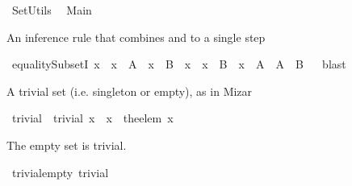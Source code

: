 %
\begin{isabellebody}%
\def\isabellecontext{SetUtils}%
%
\isamarkuptrue%
%
\isadelimtheory
%
\endisadelimtheory
%
\isatagtheory
{}\isamarkupfalse%
\ SetUtils\isanewline
{}\isanewline
\ \ Main\isanewline
\isanewline
{}%
\endisatagtheory
{\isafoldtheory}%
%
\isadelimtheory
%
\endisadelimtheory
%
\isamarkuptrue%
%
\begin{isamarkuptext}%
An inference rule that combines  and  to a single step%
\end{isamarkuptext}%
\isamarkuptrue%
\isamarkupfalse%
\ equalitySubsetI{\isacharcolon}\ {\isachardoublequoteopen}{\isacharparenleft}{\isasymAnd}x\ {\isachardot}\ x\ {\isasymin}\ A\ {\isasymLongrightarrow}\ x\ {\isasymin}\ B{\isacharparenright}\ {\isasymLongrightarrow}\ {\isacharparenleft}{\isasymAnd}x\ {\isachardot}\ x\ {\isasymin}\ B\ {\isasymLongrightarrow}\ x\ {\isasymin}\ A{\isacharparenright}\ {\isasymLongrightarrow}\ A\ {\isacharequal}\ B{\isachardoublequoteclose}%
\isadelimproof
\ %
\endisadelimproof
%
\isatagproof
{}\isamarkupfalse%
\ blast%
\endisatagproof
{\isafoldproof}%
%
\isadelimproof
%
\endisadelimproof
%
\isamarkuptrue%
%
\begin{isamarkuptext}%
A trivial set (i.e. singleton or empty), as in Mizar%
\end{isamarkuptext}%
\isamarkuptrue%
\isamarkupfalse%
\ trivial\ \ {\isachardoublequoteopen}trivial\ x\ {\isacharequal}\ {\isacharparenleft}x\ {\isasymsubseteq}\ {\isacharbraceleft}the{\isacharunderscore}elem\ x{\isacharbraceright}{\isacharparenright}{\isachardoublequoteclose}%
\begin{isamarkuptext}%
The empty set is trivial.%
\end{isamarkuptext}%
\isamarkuptrue%
\isamarkupfalse%
\ trivial{\isacharunderscore}empty{\isacharcolon}\ {\isachardoublequoteopen}trivial\ {\isacharbraceleft}{\isacharbraceright}{\isachardoublequoteclose}%

\end{isabellebody}
